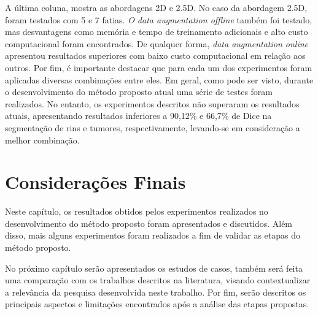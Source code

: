 A última coluna, mostra as abordagens 2D e 2.5D. No caso da abordagem 2.5D, foram testados com 5 e 7 fatias. \textit{O data augmentation offline} também foi testado, mas desvantagens como memória e tempo de treinamento adicionais e alto custo computacional foram encontrados. De qualquer forma, \textit{data augmentation online} apresentou resultados superiores com baixo custo computacional em relação aos outros. Por fim, é importante destacar que para cada um dos experimentos foram aplicadas diversas combinações entre eles. Em geral, como pode ser visto, durante o desenvolvimento do método proposto atual uma série de testes foram realizados. No entanto, os experimentos descritos não superaram os resultados atuais, apresentando resultados inferiores a 90,12\% e 66,7\% de Dice na segmentação de rins e tumores, respectivamente, levando-se em consideração a melhor combinação.

\section{Considerações Finais}
\label{considerações-finais-resultados}

Neste capítulo, os resultados obtidos pelos experimentos realizados no desenvolvimento do método proposto foram apresentados e discutidos. Além disso, mais alguns experimentos foram realizados a fim de validar as etapas do método proposto.

No próximo capítulo serão apresentados os estudos de casos, também será feita uma comparação com os trabalhos descritos na literatura, visando contextualizar a relevância da pesquisa desenvolvida neste trabalho. Por fim, serão descritos os principais aspectos e limitações encontrados após a análise das etapas propostas.

